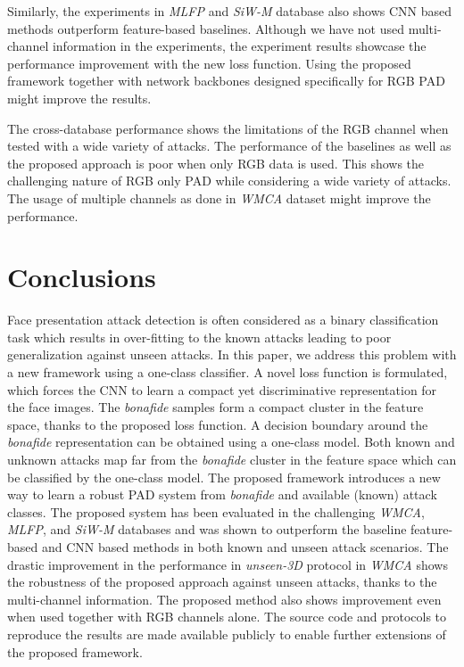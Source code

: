 \documentclass[journal]{IEEEtran}
\begin{document}
Similarly, the experiments in \textit{MLFP} and \textit{SiW-M} database also shows CNN based methods outperform feature-based baselines. Although we have not used multi-channel information in the experiments, the experiment results showcase the performance improvement with the new loss function. Using the proposed framework together with network backbones designed specifically for RGB PAD might improve the results.

The cross-database performance shows the limitations of the RGB channel when tested with a wide variety of attacks. The performance of the baselines as well as the proposed approach is poor when only RGB data is used. This shows the challenging nature of RGB only PAD while considering a wide variety of attacks. The usage of multiple channels as done in \textit{WMCA} dataset might improve the performance.


\section{Conclusions}

Face presentation attack detection is often considered as a binary classification task which results in over-fitting to the known attacks leading to poor generalization against unseen attacks. In this paper, we address this problem with a new framework using a one-class classifier. A novel loss function is formulated, which forces the CNN to learn a compact yet discriminative representation for the face images. The \textit{bonafide} samples form a compact cluster in the feature space, thanks to the proposed loss function. A decision boundary around the \textit{bonafide} representation can be obtained using a one-class model. Both known and unknown attacks map far from the \textit{bonafide} cluster in the feature space which can be classified by the one-class model. The proposed framework introduces a new way to learn a robust PAD system from \textit{bonafide} and available (known) attack classes. The proposed system has been evaluated in the challenging \textit{WMCA}, \textit{MLFP}, and \textit{SiW-M} databases and was shown to outperform the baseline feature-based and CNN based methods in both known and unseen attack scenarios. The drastic improvement in the performance in \textit{unseen-3D} protocol in \textit{WMCA} shows the robustness of the proposed approach against unseen attacks, thanks to the multi-channel information. The proposed method also shows improvement even when used together with RGB channels alone. The source code and protocols to reproduce the results are made available publicly to enable further extensions of the proposed framework.
\end{document}

